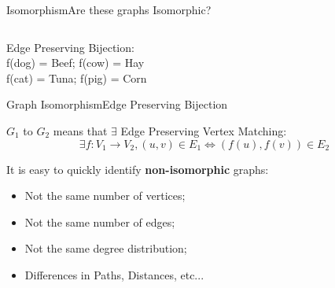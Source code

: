 \begin{frame}{Isomorphism}{Are these graphs Isomorphic?}

    \begin{columns}
    \end{columns}\bigskip

    Edge Preserving Bijection:\\
    f(dog) = Beef; \hspace{2cm} f(cow) = Hay\\
    f(cat) = Tuna; \hspace{2cm} f(pig) = Corn
\end{frame}

\begin{frame}{Graph Isomorphism}{Edge Preserving Bijection}

    $G_1$  to $G_2$ means that $\exists$
    Edge Preserving Vertex Matching:
    \begin{equation*}
      \exists f:V_1 \rightarrow V_2,
      (u,v) \in E_1 \iff (f(u),f(v)) \in E_2
    \end{equation*}\bigskip

    It is easy to quickly identify {\bf \alert{non-isomorphic}} graphs:
    \begin{itemize}
    \item Not the same number of vertices;
    \item Not the same number of edges;
    \item Not the same degree distribution;
    \item Differences in Paths, Distances, etc...
    \end{itemize}
\end{frame}

